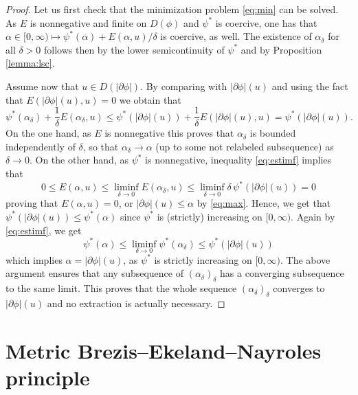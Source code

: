 \documentclass[10pt,a4paper]{amsart}
\renewcommand{\sl}{|\partial \phi|}
\begin{document}
   
 \begin{proof}
Let us first check that the minimization problem \eqref{eq:min}  can be solved.
   As $ E$ is nonnegative  and finite on $D(\phi)$  and $\psi^*$ is coercive, one has
   that $ \alpha \in [0,\infty) \mapsto \psi^*( \alpha) +  E(
   \alpha,u)/\delta$ is coercive, as well. The existence of $\alpha_\delta$ for
   all $\delta >0$
   follows then by the lower semicontinuity of $\psi^*$ and by
   Proposition \ref{lemma:lsc}.

   Assume now that $u \in D(\sl)$. By comparing with $\sl(u)$ and
   using the fact that $ E(\sl (u),u)=0$
   we obtain that 
   \begin{equation}\psi^*( \alpha_\delta) + \frac1\delta  E(
   \alpha_\delta,u) \leq \psi^*(\sl(u)) +\frac1\delta  E(\sl (u),u)   =
   \psi^*(\sl(u)).\label{eq:estimf}
   \end{equation}
   On the one hand, as $ E$ is nonnegative this proves that $\alpha_\delta$ is bounded
   independently of $\delta$, so that $\alpha_\delta \to \alpha$ (up to
   some not relabeled subsequence) as
   $\delta \to 0$. On the other hand, as $\psi^*$ is nonnegative, inequality \eqref{eq:estimf} implies that
   $$ 0\leq  E(\alpha,u) \leq \liminf_{\delta \to 0}
   E(\alpha_\delta, u) \leq \liminf_{\delta \to 0} \delta\, \psi^* (\sl(u))
   = 0$$
   proving that $ E(\alpha,u)=0$, or $\sl(u)\leq \alpha$ by \eqref{eq:max}. Hence, we get
   that $\psi^*(\sl(u))\leq \psi^*(\alpha)$ since $\psi^*$ is
   (strictly) increasing on $[0,\infty)$. Again by
   \eqref{eq:estimf}, we get
$$\psi^*(\alpha) \leq \liminf_{\delta \to 0}\psi^*(\alpha_\delta)
\leq \psi^*(\sl(u))$$
   which implies $\alpha = \sl(u)$, as $\psi^*$ is strictly
   increasing on $[0,\infty)$. The above argument  ensures  that any subsequence of
   $(\alpha_\delta)_\delta$ has a converging subsequence to the same
   limit. This proves that the whole sequence $(\alpha_\delta)_\delta$
   converges to
   $\sl (u)$ and
    no extraction is actually necessary.
  \end{proof}
  


\section{Metric  Brezis--Ekeland--Nayroles principle}
\label{sec:BEN}
\end{document}

